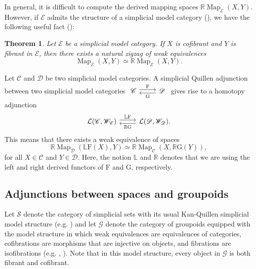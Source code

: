 \documentclass{amsart}
\newcommand{\bE}{\mathscr{E}}
\newcommand{\sSet}{\mathscr{S}}
\newcommand{\Grpd}{\mathscr{G}}
\newcommand{\Map}{\operatorname{Map}}
\newtheorem{thm}[theorem]{Theorem}%
\theoremstyle{definition}
\numberwithin{equation}{section}
\begin{document}
In general, it is difficult to compute the derived mapping spaces $\mathbb{R}\Map_{\bE}(X,Y)$. However, if $\bE$ admits the structure of a simplicial model category (\cite[Chapter 9]{hirsch}), we have the following useful fact (\cite[Corollary 4.7]{dk}):

\begin{thm}\label{thm: identifying mapping spaces in a simplicial model category}
Let $\bE$ be a simplicial model category. If $X$ is cofibrant and $Y$ is fibrant in $\bE$, then there exists a natural zigzag of weak equivalences \[\Map_{\bE}(X,Y)\simeq \mathbb{R}\Map_{\bE}(X,Y).\]
\end{thm}




Let $\mathscr{C}$ and $\mathscr{D}$ be two simplicial model categories. A simplicial Quillen adjunction between two simplicial model categories $
\begin{tikzcd} \mathscr{C}  \arrow[r, shift left =1, "\text{F}"]& \arrow[l, shift left =1, "\text{G}"]\mathscr{D} \end{tikzcd}$ gives rise to a homotopy adjunction \begin{equation}
\begin{tikzcd} \mathcal{L}(\mathscr{C},\mathscr{W}_{\mathscr{C}})  \arrow[r, shift left =1, "\mathbb{L}\text{F}"]& \arrow[l, shift left =1, "\mathbb{R}\text{G}"]\mathcal{L}(\mathscr{D},\mathscr{W}_{\mathscr{D}}). \end{tikzcd}
\end{equation} This means that there exists a weak equivalence of spaces \[\mathbb{R}\Map_{\mathscr{D}}(\mathbb{L}\text{F}(X),Y)\simeq \mathbb{R}\Map_{\mathscr{C}}(X,\mathbb{R}\text{G}(Y)),\] for all $X\in\mathscr{C}$ and $Y\in\mathscr{D}$. Here, the notion $\mathbb{L}$ and $\mathbb{R}$ denotes that we are using the left and right derived functors of $\text{F}$ and $\text{G}$, respectively. 

\subsection{Adjunctions between spaces and groupoids}\label{sec: classifying space functor}  Let $\sSet$ denote the category of simplicial sets with its usual Kan-Quillen simplicial model structure (e.g. \cite[Chapter 6.1]{balchin}) and let $\Grpd$ denote the category of groupoids equipped with the model structure in which weak equivalences are equivalences of categories, cofibrations are morphisms that are injective on objects, and fibrations are isofibrations (e.g. \cite{And}, \cite{Bous_model_cat_groupoid}).  Note that in this model structure, every object in $\Grpd$ is both fibrant and cofibrant.  
\end{document}
